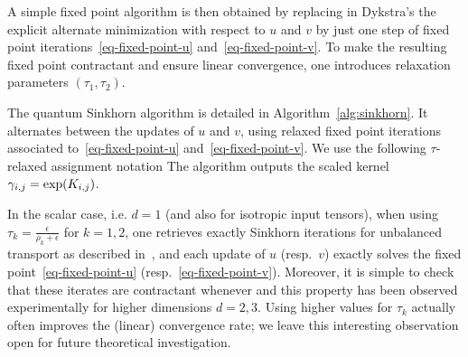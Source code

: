 A simple fixed point algorithm is then obtained by replacing in Dykstra's the explicit alternate minimization with respect to $u$ and $v$ by just one step of fixed point iterations~\eqref{eq-fixed-point-u} and~\eqref{eq-fixed-point-v}. To make the resulting fixed point contractant and ensure linear convergence, one introduces relaxation parameters $(\tau_1,\tau_2)$. 

The quantum Sinkhorn algorithm is detailed in Algorithm~\ref{alg:sinkhorn}. It alternates between the updates of $u$ and $v$, using relaxed fixed point iterations associated to~\eqref{eq-fixed-point-u} and~\eqref{eq-fixed-point-v}. We use the following $\tau$-relaxed assignment notation 
The algorithm outputs the scaled kernel $\gamma_{i,j} = \exp(K_{i,j})$.



%

\begin{rem}\label{rem-choice-tau}
 In the scalar case, i.e. $d=1$ (and also for isotropic input tensors), when using $\tau_k = \tfrac{\epsilon}{\rho_k+\epsilon}$ for $k=1,2$, one retrieves exactly Sinkhorn iterations for unbalanced transport as described in~\cite{2016-chizat-sinkhorn}, and each update of $u$ (resp.\ $v$) exactly solves the fixed point~\eqref{eq-fixed-point-u} (resp.\ \eqref{eq-fixed-point-v}). 
%
Moreover, it is simple to check that these iterates are contractant whenever
\eq{
	\tau_k \in ]0,\tfrac{2 \epsilon}{\epsilon+\rho_k}[
	\quad\text{for } k=1,2.
}
	and this property has been observed experimentally for higher dimensions $d=2,3$. Using higher values for $\tau_k$ actually often improves the (linear) convergence rate; we leave this interesting observation open for future theoretical investigation. 
\end{rem}


